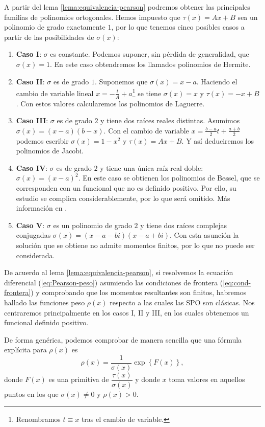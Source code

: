 A partir del lema \ref{lema:equivalencia-pearson} podremos obtener las principales familias de polinomios ortogonales. Hemos impuesto que $\tau(x)=Ax+B$ sea un polinomio de grado exactamente $1$, por lo que tenemos cinco posibles casos a partir de las posibilidades de $\sigma(x)$:

\begin{enumerate}
    \item \textbf{Caso I}: $\sigma$ es constante. Podemos suponer, sin pérdida de generalidad, que $\sigma(x) = 1$. En este caso obtendremos los llamados polinomios de Hermite.
    \item \textbf{Caso II}: $\sigma$ es de grado $1$. Suponemos que $\sigma(x) = x-a$. Haciendo el cambio de variable lineal $x = -\frac t A+a$\footnote{Renombramos $t\equiv x$ tras el cambio de variable.} se tiene $\sigma(x) = x$ y $\tau(x)=-x+B$. Con estos valores calcularemos los polinomios de Laguerre.
    \item \textbf{Caso III}: $\sigma$ es de grado $2$ y tiene dos raíces reales distintas. Asumimos $\sigma(x) = (x-a)(b-x)$. Con el cambio de variable $x = \frac{b-a}{2}t + \frac{a+b}{2}$ podemos escribir $\sigma(x)=1-x^2$ y $\tau(x)=Ax+B$. Y así deduciremos los polinomios de Jacobi.
    \item \textbf{Caso IV}: $\sigma$ es de grado $2$ y tiene una única raíz real doble: $\sigma(x) = (x-a)^2$. En este caso se obtienen los polinomios de Bessel, que se corresponden con un funcional que no es definido positivo. Por ello, su estudio se complica considerablemente, por lo que será omitido. Más información en \cite{Bessel-polynomials}.  
    \item \textbf{Caso V}: $\sigma$ es un polinomio de grado $2$ y tiene dos raíces complejas conjugadas \linebreak $\sigma(x) = (x-a-bi)(x-a+bi)$. Con esta asunción la solución que se obtiene no admite momentos finitos, por lo que no puede ser considerada.
\end{enumerate}

De acuerdo al lema \ref{lema:equivalencia-pearson}, si resolvemos la ecuación diferencial (\ref{eq:Pearson-peso}) asumiendo las condiciones de frontera (\ref{eq:cond-frontera}) y comprobando que los momentos resultantes son finitos, habremos hallado las funciones peso $\rho(x)$ respecto a las cuales las SPO son clásicas. Nos centraremos principalmente en los casos I, II y III, en los cuales obtenemos un funcional definido positivo.

De forma genérica, podemos comprobar de manera sencilla que una fórmula explícita para $\rho(x)$ es
\begin{equation}
    \label{eq:rho-general}
    \rho(x) = \dfrac{1}{\sigma(x)}\exp\left\{F(x)\right\},
\end{equation}
donde $F(x)$ es una primitiva de $\dfrac{\tau(x)}{\sigma(x)}$ y donde $x$ toma valores en aquellos puntos en los que $\sigma(x)\neq 0$ y $\rho(x)>0$.

